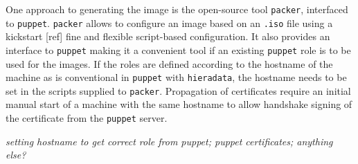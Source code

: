 
One approach to generating the image is the open-source tool
\texttt{packer}\cite{packer}, interfaced to \texttt{puppet}\cite{puppet}.
\texttt{packer} allows to configure an image based on an \texttt{.iso} file using a kickstart [ref] fine and flexible script-based configuration. 
It also provides an interface to \texttt{puppet} making it a convenient tool if an existing \texttt{puppet} role is to be used for the images. If the roles are defined according to the hostname of the machine as is conventional in \texttt{puppet} with \texttt{hieradata}, the hostname needs to be set in the scripts supplied to \texttt{packer}. Propagation of certificates require an initial manual start of a machine with the same hostname to allow handshake signing of the certificate from the \texttt{puppet} server.

\textit{setting hostname to get correct role from puppet; puppet certificates; anything else? }